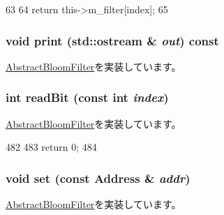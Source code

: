 \begin{DoxyCode}
63     {
64         return this->m_filter[index];
65     }
\end{DoxyCode}
\hypertarget{classH3BloomFilter_ac55fe386a101fbae38c716067c9966a0}{
\subsubsection[{print}]{\setlength{\rightskip}{0pt plus 5cm}void print (std::ostream \& {\em out}) const}}
\label{classH3BloomFilter_ac55fe386a101fbae38c716067c9966a0}


\hyperlink{classAbstractBloomFilter_a3ea5f7af5db62cc24f4e40df9ea5c971}{AbstractBloomFilter}を実装しています。\hypertarget{classH3BloomFilter_a6f8a98d0f38a8d122d4cbf87323484eb}{
\subsubsection[{readBit}]{\setlength{\rightskip}{0pt plus 5cm}int readBit (const int {\em index})}}
\label{classH3BloomFilter_a6f8a98d0f38a8d122d4cbf87323484eb}


\hyperlink{classAbstractBloomFilter_a6c0e9a098f0f210aa42eb2f1553804eb}{AbstractBloomFilter}を実装しています。


\begin{DoxyCode}
482 {
483     return 0;
484 }
\end{DoxyCode}
\hypertarget{classH3BloomFilter_a2b666fae2a5c2b98bc5cba8e1333bcc9}{
\subsubsection[{set}]{\setlength{\rightskip}{0pt plus 5cm}void set (const {\bf Address} \& {\em addr})}}
\label{classH3BloomFilter_a2b666fae2a5c2b98bc5cba8e1333bcc9}


\hyperlink{classAbstractBloomFilter_a54e1262ae5f60efeb8714d0556b3c32e}{AbstractBloomFilter}を実装しています。


